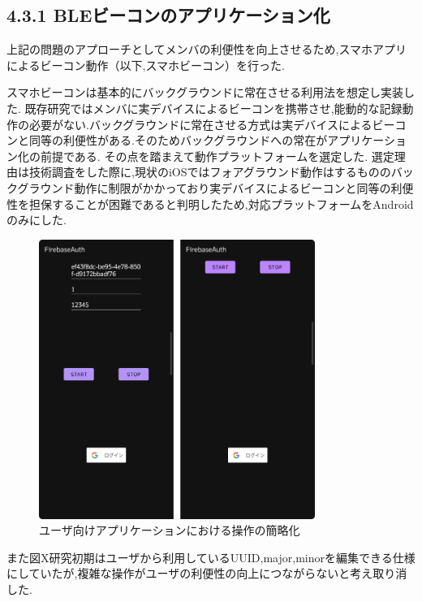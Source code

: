 \subsection*{4.3.1 BLEビーコンのアプリケーション化}
上記の問題のアプローチとしてメンバの利便性を向上させるため,スマホアプリによるビーコン動作（以下,スマホビーコン）を行った.

スマホビーコンは基本的にバックグラウンドに常在させる利用法を想定し実装した.
既存研究ではメンバに実デバイスによるビーコンを携帯させ,能動的な記録動作の必要がない.バックグラウンドに常在させる方式は実デバイスによるビーコンと同等の利便性がある.そのためバックグラウンドへの常在がアプリケーション化の前提である.
その点を踏まえて動作プラットフォームを選定した.
選定理由は技術調査をした際に,現状のiOSではフォアグラウンド動作はするもののバックグラウンド動作に制限がかかっており実デバイスによるビーコンと同等の利便性を担保することが困難であると判明したため,対応プラットフォームをAndroidのみにした.



\begin{figure}[tbh]
  \centering
  \includegraphics[width=9cm]{image/AppBeforeAfter.png}
  \caption{ユーザ向けアプリケーションにおける操作の簡略化}
  \label{multipleBPM}
\end{figure}
また図X研究初期はユーザから利用しているUUID,major,minorを編集できる仕様にしていたが,複雑な操作がユーザの利便性の向上につながらないと考え取り消した.




